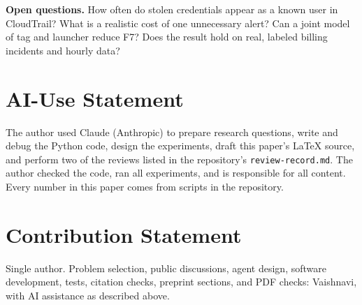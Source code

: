 \documentclass{article}
\begin{document}
\noindent\textbf{Open questions.} How often do stolen credentials appear as a known user in CloudTrail? What is a realistic cost of one unnecessary alert? Can a joint model of tag and launcher reduce F7? Does the result hold on real, labeled billing incidents and hourly data?

\section*{AI-Use Statement}
The author used Claude (Anthropic) to prepare research questions, write and debug the Python code, design the experiments, draft this paper's LaTeX source, and perform two of the reviews listed in the repository's \texttt{review-record.md}. The author checked the code, ran all experiments, and is responsible for all content. Every number in this paper comes from scripts in the repository.

\section*{Contribution Statement}
Single author. Problem selection, public discussions, agent design, software development, tests, citation checks, preprint sections, and PDF checks: Vaishnavi, with AI assistance as described above.


\end{document}
